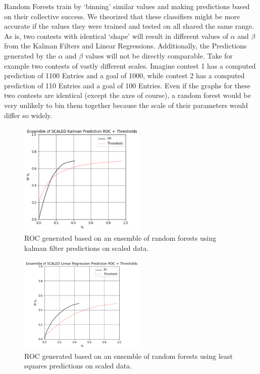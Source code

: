Random Forests train by `binning' similar values and making predictions based on their collective success. We theorized that these classifiers might be more accurate if the values they were trained and tested on all shared the same range. As is, two contests with identical `shape' will result in different values of $\alpha$ and $\beta$ from the Kalman Filters and Linear Regressions. Additionally, the Predictions generated by the $\alpha$ and $\beta$ values will not be directly comparable. Take for example two contests of vastly different scales. Imagine contest 1 has a computed prediction of 1100 Entries and a goal of 1000, while contest 2 has a computed prediction of 110 Entries and a goal of 100 Entries. Even if the graphs for these two contests are  identical (except the axes of course), a random forest would be very unlikely to bin them together because the scale of their parameters would differ so widely. 

\begin{figure}[h]
\centering
\includegraphics[width=6cm]{body/results/ensFKs.png}
\caption{ROC generated based on an ensemble of random forests using kalman filter predictions on scaled data.}
\label{fig:scaleKF}
\end{figure}

\begin{figure}[h]
\centering
\includegraphics[width=6cm]{body/results/ensLRs.png}
\caption{ROC generated based on an ensemble of random forests using least squares predictions on scaled data.}
\label{fig:scaleLR}
\end{figure}

